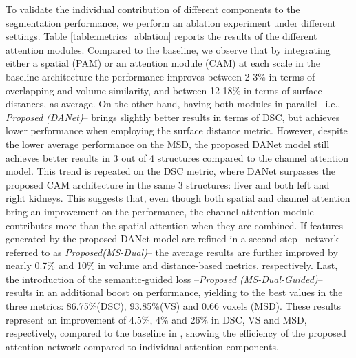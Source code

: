 \documentclass[journal]{IEEEtran}
\begin{document}
To validate the individual contribution of different components to the segmentation performance, we perform an ablation experiment under different settings. Table \ref{table:metrics_ablation} reports the results of the different attention modules. Compared to the baseline, we observe that by integrating either a spatial (PAM) or an attention module (CAM) at each scale in the baseline architecture the performance improves between 2-3\% in terms of overlapping and volume similarity, and between 12-18\% in terms of surface distances, as average. On the other hand, having both modules in parallel --i.e., \textit{Proposed (DANet)}-- brings slightly better results in terms of DSC, but achieves lower performance when employing the surface distance metric. However, despite the lower average performance on the MSD, the proposed DANet model still achieves better results in 3 out of 4 structures compared to the channel attention model. This trend is repeated on the DSC metric, where DANet surpasses the proposed CAM architecture in the same 3 structures: liver and both left and right kidneys. This suggests that, even though both spatial and channel attention bring an improvement on the performance, the channel attention module contributes more than the spatial attention when they are combined. If features generated by the proposed DANet model are refined in a second step --network referred to as \textit{Proposed(MS-Dual)}-- the average results are further improved by nearly 0.7\% and 10\% in volume and distance-based metrics, respectively. Last, the introduction of the semantic-guided loss --\textit{Proposed (MS-Dual-Guided)}-- results in an additional boost on performance, yielding to the best values in the three metrics: 86.75\%(DSC), 93.85\%(VS) and 0.66 voxels (MSD). These results represent an improvement of 4.5\%, 4\% and 26\% in DSC, VS and MSD, respectively, compared to the baseline in \cite{wang18d}, showing the efficiency of the proposed attention network compared to individual attention components.
\end{document}
